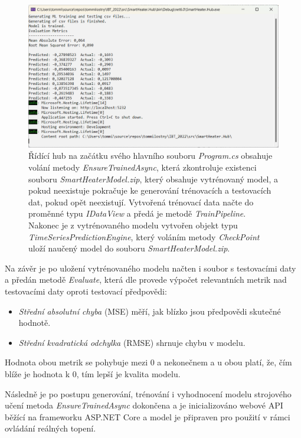 \begin{figure}[hbt]
\includegraphics[width=\textwidth]{obrazky-figures/ml-training.png}
\caption{Řídící hub na začátku svého hlavního souboru {\it Program.cs} obsahuje volání metody {\it EnsureTrainedAsync}, která zkontroluje existenci souboru {\it SmartHeaterModel.zip}, který obsahuje vytrénovaný model, a pokud neexistuje pokračuje ke generování trénovacích a testovacích dat, pokud opět neexistují. Vytvořená trénovací data načte do proměnné typu {\it IDataView} a předá je metodě {\it TrainPipeline}. Nakonec je z vytrénovaného modelu vytvořen objekt typu {\it TimeSeriesPredictionEngine}, který voláním metody {\it CheckPoint} uloží naučený model do souboru {\it SmartHeaterModel.zip}.}
\end{figure}

\noindent Na závěr je po uložení vytrénovaného modelu načten i soubor s testovacími daty a předán metodě {\it Evaluate}, která dle \cite{mlnet_tutorial} provede výpočet relevantních metrik nad testovacími daty oproti testovací předpovědi:
\begin{itemize}
    \item {\it Střední absolutní chyba} (MSE) měří, jak blízko jsou předpovědi skutečné hodnotě.
    \item {\it Střední kvadratická odchylka} (RMSE) shrnuje chybu v modelu.
\end{itemize}

Hodnota obou metrik se pohybuje mezi 0 a nekonečnem a u obou platí, že, čím blíže je hodnota k 0, tím lepší je kvalita modelu.

Následně je po postupu generování, trénování i vyhodnocení modelu strojového učení metoda {\it EnsureTrainedAsync} dokončena a je inicializováno webové API běžící na frameworku ASP.NET Core a model je připraven pro použití v rámci ovládání reálných topení.

